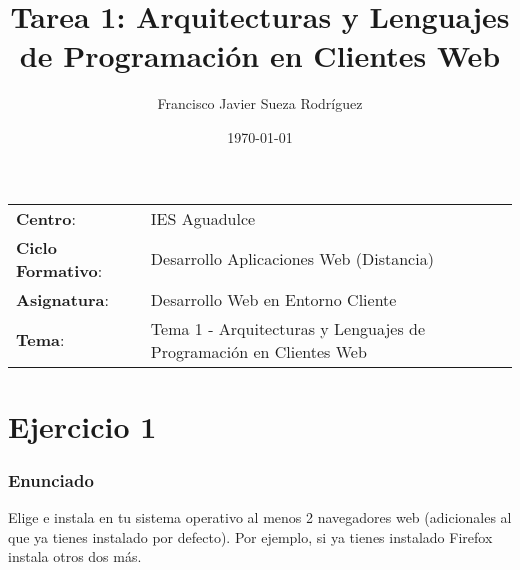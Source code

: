 


\title{
\vspace{10ex}
\normalfont \normalsize
\huge \textbf{Tarea 1: Arquitecturas y Lenguajes de Programación en Clientes Web}
}
\author{Francisco Javier Sueza Rodríguez}
\date{\normalsize\today}



\maketitle

\thispagestyle{empty}

\vspace{65ex}

\begin{center}
    \begin{tabular}{l l}
        \textbf{Centro}: & IES Aguadulce \\
        \textbf{Ciclo Formativo}: & Desarrollo Aplicaciones Web (Distancia)\\
        \textbf{Asignatura}: & Desarrollo Web en Entorno Cliente\\
        \textbf{Tema}: & Tema 1 -  Arquitecturas y Lenguajes de Programación en Clientes Web\\
    \end{tabular}
\end{center}

\newpage

\section{Ejercicio 1}

\subsubsection{Enunciado}
Elige  e instala en tu sistema operativo al menos 2 navegadores web (adicionales al que ya tienes instalado por defecto). Por ejemplo, si ya tienes instalado Firefox instala otros dos más.

